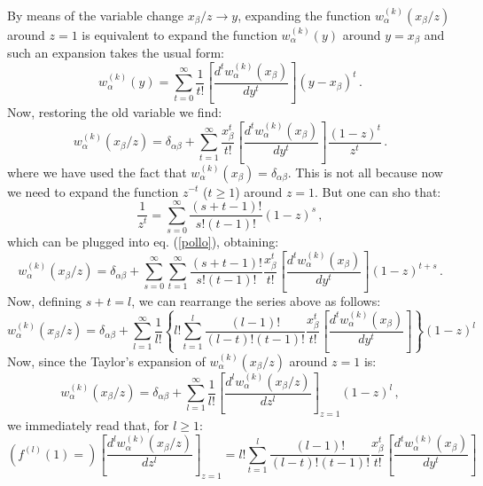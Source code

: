 \documentclass[10pt,a4paper]{article}
\begin{document}
By means of the variable change $x_\beta/z\rightarrow y$, expanding the function $w_{\alpha}^{(k)}(x_\beta/z)$ around $z=1$ is
equivalent to expand the function $w_{\alpha}^{(k)}(y)$ around
$y=x_\beta$ and such an expansion takes the usual form:
\begin{equation}
w_{\alpha}^{(k)}(y) = \sum_{t=0}^\infty \frac{1}{t!} \left[\frac{d^t
  w_\alpha^{(k)}(x_\beta)}{dy^t}\right] (y-x_\beta)^t\,.
\end{equation}
Now, restoring the old variable we find:
\begin{equation}\label{pollo}
w_{\alpha}^{(k)}(x_\beta/z) = \delta_{\alpha\beta}+\sum_{t=1}^\infty \frac{x_\beta^t}{t!} \left[\frac{d^t
  w_\alpha^{(k)}(x_\beta)}{dy^t}\right] \frac{(1-z)^t}{z^t}\,.
\end{equation}
where we have used the fact that $w_{\alpha}^{(k)}(x_\beta) =
\delta_{\alpha\beta}$. This is not all because now we need to expand the function $z^{-t}$
($t \geq 1$) around $z=1$. But one can sho that:
\begin{equation}
\frac{1}{z^t}=\sum_{s=0}^{\infty}\frac{(s+t-1)!}{s!(t-1)!}(1-z)^s\,,
\end{equation}
which can be plugged into eq. (\ref{pollo}), obtaining:
\begin{equation}\label{pollo1}
w_{\alpha}^{(k)}(x_\beta/z) = \delta_{\alpha\beta}+\sum_{s=0}^{\infty}\sum_{t=1}^\infty \frac{(s+t-1)!}{s!(t-1)!}\frac{x_\beta^t}{t!} \left[\frac{d^t
  w_\alpha^{(k)}(x_\beta)}{dy^t}\right] (1-z)^{t+s}\,.
\end{equation}
Now, defining $s+t=l$, we can rearrange the series above as follows:
\begin{equation}\label{pollo2}
w_{\alpha}^{(k)}(x_\beta/z) = \delta_{\alpha\beta}+\sum_{l=1}^{\infty}\frac1{l!}\left\{l!\sum_{t=1}^l \frac{(l-1)!}{(l-t)!(t-1)!}\frac{x_\beta^t}{t!} \left[\frac{d^t
  w_\alpha^{(k)}(x_\beta)}{dy^t}\right] \right\}(1-z)^l
\end{equation}
Now, since the Taylor's expansion of $w_{\alpha}^{(k)}(x_\beta/z)$
around $z=1$ is:
\begin{equation}\label{pollo3}
w_{\alpha}^{(k)}(x_\beta/z) = \delta_{\alpha\beta}+\sum_{l=1}^{\infty}\frac1{l!}\left[\frac{d^l
  w_\alpha^{(k)}(x_\beta/z)}{dz^l}\right]_{z=1} (1-z)^l\,,
\end{equation}
we immediately read that, for $l\geq 1$:
\begin{equation}\label{pollo4}
(f^{(l)}(1)=)\left[\frac{d^l w_\alpha^{(k)}(x_\beta/z)}{dz^l}\right]_{z=1} = l!\sum_{t=1}^l \frac{(l-1)!}{(l-t)!(t-1)!}\frac{x_\beta^t}{t!} \left[\frac{d^t
  w_\alpha^{(k)}(x_\beta)}{dy^t}\right]
\end{equation}
\end{document}
